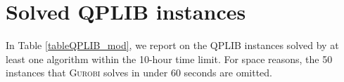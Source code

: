 \documentclass[twoside]{article}
\begin{document}
	
\newpage	\section{Solved QPLIB instances}
	\label{app:solvedQPLIB}
	
	In Table \ref{tableQPLIB_mod}, we report on the QPLIB instances solved by at least one algorithm within the 10-hour time limit. For space reasons, the 50 instances that \textsc{Gurobi} solves in under 60 seconds are omitted. %
\end{document}

